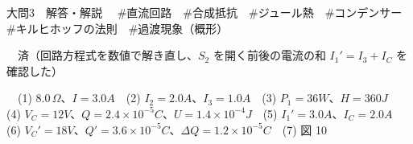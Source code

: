 \documentclass[paper=b5, fontsize=8pt, fleqn, twoside]{jlreq}
\begin{document}
\begin{ascolorbox4A}[75点・30分]{大問3　解答・解説}
　\#直流回路　\#合成抵抗　\#ジュール熱　\#コンデンサー　\#キルヒホッフの法則　\#過渡現象（概形）\par
{}　済（回路方程式を数値で解き直し、$S_2$ を開く前後の電流の和 $I_1'=I_3+I_C$ を確認した）\par
{}　(1) $8.0\,\Omega$、$I=3.0\unit{A}$　(2) $I_2=2.0\unit{A}$、$I_3=1.0\unit{A}$　(3) $P_1=36\unit{W}$、$H=360\unit{J}$　(4) $V_C=12\unit{V}$、$Q=2.4\times10^{-5}\unit{C}$、$U=1.4\times10^{-4}\unit{J}$　(5) $I_1'=3.0\unit{A}$、$I_C=2.0\unit{A}$　(6) $V_C'=18\unit{V}$、$Q'=3.6\times10^{-5}\unit{C}$、$\Delta Q=1.2\times10^{-5}\unit{C}$　(7) 図 10
\end{ascolorbox4A}
\end{document}
